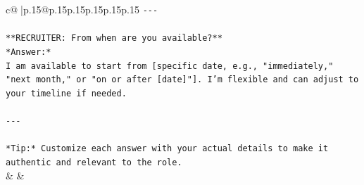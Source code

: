 \documentclass{article}
\begin{document}
{\begin{supertabular}{c@{$\;$}|p{.15\linewidth}@{}p{.15\linewidth}p{.15\linewidth}p{.15\linewidth}p{.15\linewidth}p{.15\linewidth}}
{{{\texttt{{-}{-}{-}} \\
\\ 
\texttt{**RECRUITER: From when are you available?**  } \\
\texttt{*Answer:*  } \\
\texttt{I am available to start from {[}specific date, e.g., "immediately," "next month," or "on or after {[}date{]}"{]}. I’m flexible and can adjust to your timeline if needed.} \\
\\ 
\texttt{{-}{-}{-}} \\
\\ 
\texttt{*Tip:* Customize each answer with your actual details to make it authentic and relevant to the role.} \\
            }
        }
    }
    & & \\ \\


\end{supertabular}}
\end{document}
